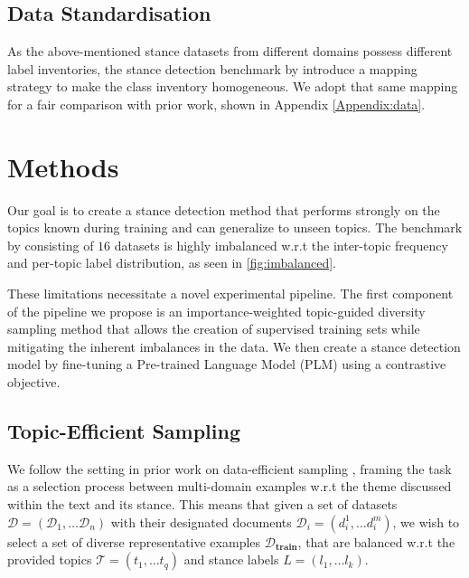 \documentclass[11pt]{article}
\begin{document}
\subsection{Data Standardisation}

As the above-mentioned stance datasets from different domains possess different label inventories, the stance detection benchmark by \citet{hardalov2021cross} introduce a mapping strategy to make the class inventory homogeneous. We adopt that same mapping for a fair comparison with prior work, shown in Appendix \ref{Appendix:data}.


\section{Methods}

Our goal is to create a stance detection method that performs strongly on the topics known during training and can generalize to unseen topics. The benchmark by \citet{hardalov2021cross} consisting of $16$ datasets is highly imbalanced w.r.t the inter-topic frequency and per-topic label distribution, as seen in \autoref{fig:imbalanced}. 

These limitations necessitate a novel experimental pipeline. The first component of the pipeline we propose is an importance-weighted topic-guided diversity sampling method that allows the creation of supervised training sets while mitigating the inherent imbalances in the data. We then create a stance detection model by fine-tuning a Pre-trained Language Model (PLM) using a contrastive objective.



\label{sec:methods}




\subsection{Topic-Efficient Sampling}
\label{sec:methods:topic}


We follow the setting in prior work on data-efficient sampling \cite{buchert2022exploiting,yan2022mitigating}, framing the task as a selection process between multi-domain examples w.r.t the theme discussed within the text and its stance. This means that given a set of datasets $\mathcal{D} = (\mathcal{D}_1, \dots \mathcal{D}_n)$ with their designated documents $\mathcal{D}_i = (d_{i}^1, \dots d_{i}^m)$, we wish to select a set of diverse representative examples $\mathcal{D}_{\textbf{train}}$, that are balanced w.r.t the provided topics $\mathcal{T} = (t_1, \dots t_q)$ and stance labels $L = (l_1, \dots l_k)$. 
\end{document}
